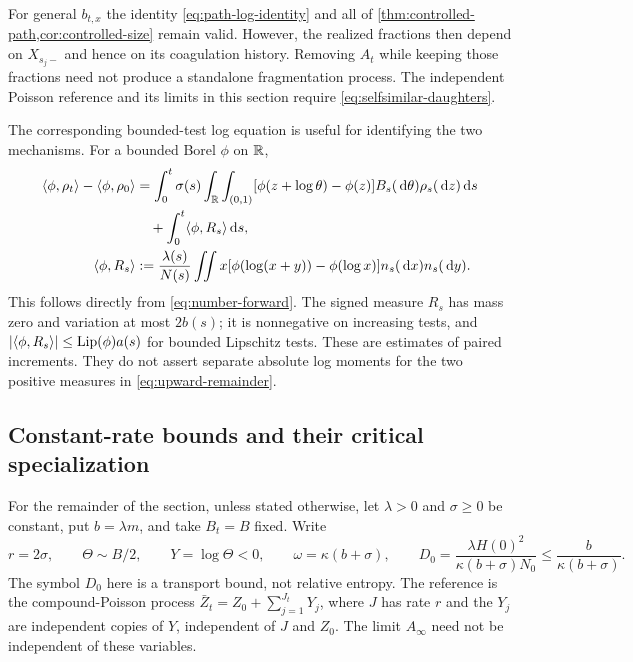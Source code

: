 \begin{remark}\label{rem:adaptive-marks}
For general $b_{t,x}$ the identity \eqref{eq:path-log-identity} and all
of \cref{thm:controlled-path,cor:controlled-size} remain valid. However,
the realized fractions then depend on $X_{s_j-}$ and hence on its
coagulation history. Removing $A_t$ while keeping those fractions
need not produce a standalone fragmentation process. The independent
Poisson reference and its limits in this section require
\eqref{eq:selfsimilar-daughters}.
\end{remark}

The corresponding bounded-test log equation is useful for identifying
the two mechanisms. For a bounded Borel $\phi$ on $\mathbb R$,
\begin{align}
 \langle \phi,\rho_t\rangle-\langle \phi,\rho_0\rangle
 &=\int_0^t\sigma(s)\int_{\mathbb R}\int_{(0,1)}
 [\phi(z+\log\theta)-\phi(z)]B_s(\,\mathrm d\theta)\rho_s(\,\mathrm d z)\,\mathrm d s
 \notag\\
 &\quad+\int_0^t\langle \phi,R_s\rangle\,\mathrm d s,\label{eq:normalized-log}\\
 \langle \phi,R_s\rangle
 &:=\frac{\lambda(s)}{N(s)}\iint x
       [\phi(\log(x+y))-\phi(\log x)]n_s(\,\mathrm d x)n_s(\,\mathrm d y).
 \label{eq:upward-remainder}
\end{align}
This follows directly from \eqref{eq:number-forward}. The signed
measure $R_s$ has mass zero and variation at most $2b(s)$; it is
nonnegative on increasing tests, and
$|\langle \phi,R_s\rangle|\leq\mathrm{Lip}(\phi)a(s)$ for bounded Lipschitz tests.
These are estimates of paired increments. They do not assert separate
absolute log moments for the two positive measures in
\eqref{eq:upward-remainder}.

\subsection{Constant-rate bounds and their critical specialization}

For the remainder of the section, unless stated otherwise, let
$\lambda>0$ and $\sigma\geq0$ be constant, put $b=\lambda m$, and
take $B_t=B$ fixed. Write
\begin{equation}
 r=2\sigma,\qquad \Theta\sim B/2,\qquad Y=\log\Theta<0,\qquad
 \omega=\kappa(b+\sigma),\qquad
 D_0=\frac{\lambda H(0)^2}{\kappa(b+\sigma)N_0}
       \leq\frac b{\kappa(b+\sigma)}.
 \label{eq:constant-log-parameters}
\end{equation}
The symbol $D_0$ here is a transport bound, not relative entropy.
The reference is the compound-Poisson process
$\bar Z_t=Z_0+\sum_{j=1}^{J_t}Y_j$, where $J$ has rate $r$ and
the $Y_j$ are independent copies of $Y$, independent of $J$ and $Z_0$.
The limit $A_\infty$ need not be independent of these variables.

